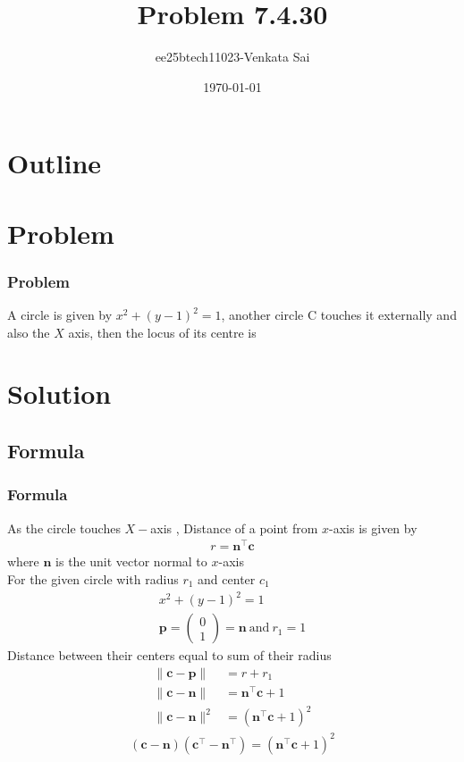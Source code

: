 \documentclass{beamer}
\title{Problem 7.4.30}
\author{ee25btech11023-Venkata Sai}
\date{\today}
\providecommand{\brak}[1]{\ensuremath{\left(#1\right)}}
\theoremstyle{remark}
\providecommand{\norm}[1]{\lVert#1\rVert}
\newcommand{\myvec}[1]{\ensuremath{\begin{pmatrix}#1\end{pmatrix}}}
\let\vec\mathbf
\numberwithin{equation}{section}
\begin{document}
\begin{frame}
\titlepage
\end{frame}

\section*{Outline}
\begin{frame}
\tableofcontents
\end{frame}

\section{Problem}

\begin{frame}
\frametitle{Problem}
\setcounter{section}{1}
A circle is given by $x^2+(y - 1)^2=1$, another circle C touches it externally and also the $X$ axis, then the locus of its centre is 
\end{frame}
\section{Solution}

\subsection{Formula}
\begin{frame}
\frametitle{Formula}
 As the circle touches $X-$axis , Distance of a point from $x$-axis is given by
\begin{align}
    r=\vec{n}^\top\vec{c}
\end{align}
where $\vec{n}$ is the unit vector normal to $x$-axis\\
For the given circle with radius $r_1$ and center $c_1$
\begin{align}
 x^2+(y - 1)^2=1\\
 \vec{p}=\myvec{0\\1}=\vec{n}\ \text{and}\ r_1=1 
\end{align}
Distance between their centers equal to sum of their radius
\begin{align}
    \norm{\vec{c}-\vec{p}}&=r+r_1\\
\norm{\vec{c}-\vec{n}}&=\vec{n}^\top\vec{c}+1 \\
\norm{\vec{c}-\vec{n}}^2&=\brak{\vec{n}^\top\vec{c}+1}^2 
\end{align}
\begin{align}
\brak{\vec{c}-\vec{n}}\brak{\vec{c}^\top-\vec{n}^\top}=\brak{\vec{n}^\top\vec{c}+1}^2 
\end{align}
\end{frame}
\end{document}
